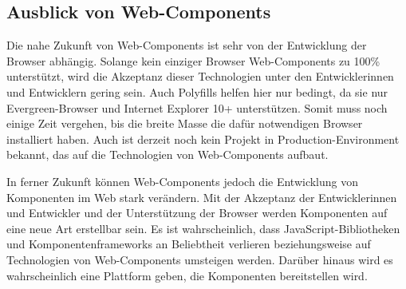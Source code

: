 \subsection{Ausblick von Web-Components}
\label{sec:5_Ausblick}

Die nahe Zukunft von Web-Components ist sehr von der Entwicklung der Browser abhängig. Solange kein einziger Browser Web-Components zu 100\% unterstützt, wird die Akzeptanz dieser Technologien unter den Entwicklerinnen und Entwicklern gering sein. Auch Polyfills helfen hier nur bedingt, da sie nur \glqq Evergreen\grqq -Browser und Internet Explorer 10+ unterstützen. Somit muss noch einige Zeit vergehen, bis die breite Masse die dafür notwendigen Browser installiert haben. Auch ist derzeit noch kein Projekt in Production-Environment bekannt, das auf die Technologien von Web-Components aufbaut.

In ferner Zukunft können Web-Components jedoch die Entwicklung von Komponenten im Web stark verändern. Mit der Akzeptanz der Entwicklerinnen und Entwickler und der Unterstützung der Browser werden Komponenten auf eine neue Art erstellbar sein. Es ist wahrscheinlich, dass JavaScript-Bibliotheken und Komponentenframeworks an Beliebtheit verlieren beziehungsweise auf Technologien von Web-Components umsteigen werden. Darüber hinaus wird es wahrscheinlich eine Plattform geben, die Komponenten bereitstellen wird.